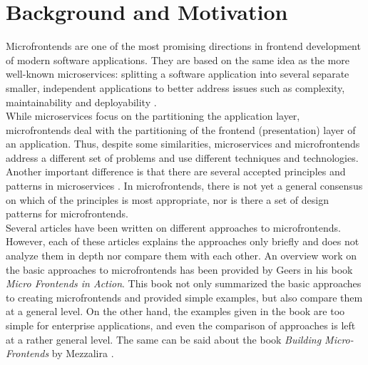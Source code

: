 \section{Background and Motivation}
Microfrontends are one of the most promising directions in frontend development of modern software applications. They are based on the same idea as the more well-known microservices: splitting a software application into several separate smaller, independent applications to better address issues such as complexity, maintainability and deployability \cite{MezzaliraBuildingMf}\cite{Geers}\cite{Pavlenko}. \\

\noindent
While microservices focus on the partitioning the application layer, microfrontends deal with the partitioning of the frontend (presentation) layer of an application. Thus, despite some similarities, microservices and microfrontends address a different set of problems and use different techniques and technologies. Another important difference is that there are several accepted principles and patterns in microservices \cite{RichardsonPatterns}\cite{NewmanBuildingMs}. In microfrontends, there is not yet a general consensus on which of the principles is most appropriate, nor is there a set of design patterns for microfrontends. \\

\noindent
Several articles \cite{Pavlenko}\cite{Peltonen}\cite{Montelius}\cite{Jackson} have been written on different approaches to microfrontends. However, each of these articles explains the approaches only briefly and does not analyze them in depth nor compare them with each other. An overview work on the basic approaches to microfrontends has been provided by Geers \cite{Geers} in his book \emph{Micro Frontends in Action}. This book not only summarized the basic approaches to creating microfrontends and provided simple examples, but also compare them at a general level. On the other hand, the examples given in the book are too simple for enterprise applications, and even the comparison of approaches is left at a rather general level. The same can be said about the book \emph{Building Micro-Frontends} by Mezzalira \cite{MezzaliraBuildingMf}.